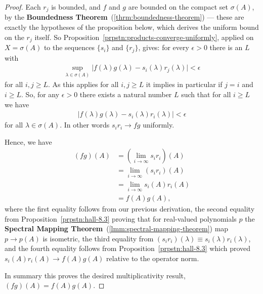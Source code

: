 \begin{proof}
Each $r_j$ is bounded, and $f$ and $g$ are bounded on the compact set $\sigma(A)$, by the \textbf{Boundedness Theorem}~(\ref{thrm:boundedness-theorem}) — these are exactly the hypotheses of the proposition below, which derives the uniform bound on the $r_j$ itself. So Proposition~\ref{prpstn:products-converge-uniformly}, applied on $X = \sigma(A)$ to the sequences $\{s_i\}$ and $\{r_j\}$, gives: for every $\epsilon > 0$ there is an $L$ with
\begin{align}
    \sup\limits_{\lambda \in \sigma(A)} \lvert f(\lambda)g(\lambda) - s_i(\lambda)r_j(\lambda) \rvert < \epsilon
\end{align}
for all $i,j \ge L$.
As this applies for all $i,j \ge L$ it implies in particular if $j = i$ and $i \ge L$. So, for any $\epsilon > 0$ there exists a natural number $L$ such that for all $i \ge L$ we have 
\begin{align}
    \lvert f(\lambda)g(\lambda) - s_i(\lambda)r_i(\lambda) \rvert < \epsilon
\end{align}
for all $\lambda \in \sigma(A)$. In other words $s_ir_i \rightarrow fg$ uniformly.

Hence, we have
\begin{align}
    (fg)(A) &= (\lim_{i \rightarrow \infty} s_ir_i)(A) \\
            &= \lim_{i \rightarrow \infty} (s_ir_i)(A) \\
            &= \lim_{i \rightarrow \infty} s_i(A) r_i(A) \\
            &= f(A) g(A),
\end{align}
where the first equality follows from our previous derivation, the second equality from Proposition~\ref{prpstn:hall-8.3} proving that for real-valued polynomials $p$ the \textbf{Spectral Mapping Theorem}~(\ref{lmm:spectral-mapping-theorem}) map $p \rightarrow p(A)$ is isometric, the third equality from $(s_ir_i)(\lambda) \equiv s_i(\lambda)r_i(\lambda)$, and the fourth equality follows from Proposition~\ref{prpstn:hall-8.3} which proved $s_i(A)r_i(A) \rightarrow f(A)g(A)$ relative to the operator norm.

In summary this proves the desired multiplicativity result, $(fg)(A) = f(A) g(A)$.
\end{proof}

